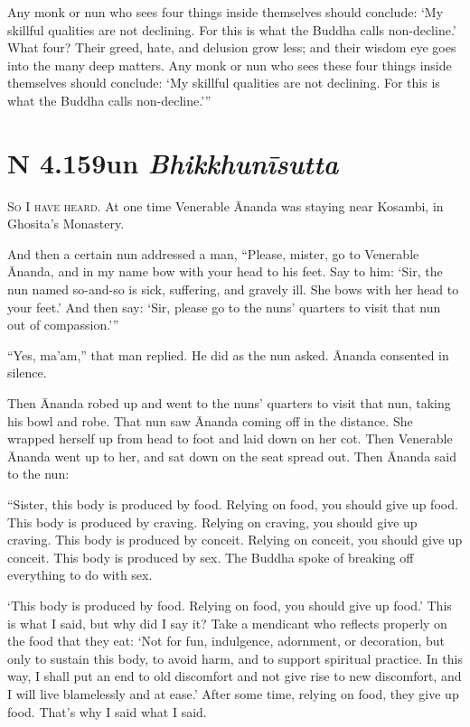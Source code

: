 \documentclass[12pt,openany]{book}%
\newcommand*{\suttatitleacronym}[1]{\smaller[2]{#1}\vspace*{.3em}}
\newcommand*{\suttatitletranslation}[1]{\linebreak{#1}}
\newcommand*{\suttatitleroot}[1]{\linebreak\smaller[2]\itshape{#1}}
\newcommand*{\tocacronym}[1]{\hspace*{-3.3em}{#1}\quad}
\newcommand*{\toctranslation}[1]{#1}
\newcommand*{\tocroot}[1]{(\textit{#1})}
\newcommand*{\scevam}[1]{\textsc{#1}}
\begin{document}
Any monk or nun who sees four things inside themselves should conclude: ‘My skillful qualities are not declining. For this is what the Buddha calls non-decline.’ What four? Their greed, hate, and delusion grow less; and their wisdom eye goes into the many deep matters. Any monk or nun who sees these four things inside themselves should conclude: ‘My skillful qualities are not declining. For this is what the Buddha calls non-decline.’” 

%
\section*{{\suttatitleacronym AN 4.159}{\suttatitletranslation Nun }{\suttatitleroot Bhikkhunīsutta}}
\addcontentsline{toc}{section}{\tocacronym{AN 4.159} \toctranslation{Nun } \tocroot{Bhikkhunīsutta}}

\scevam{So I have heard. }At one time Venerable Ānanda was staying near Kosambi, in Ghosita’s Monastery. 

And then a certain nun addressed a man, “Please, mister, go to Venerable Ānanda, and in my name bow with your head to his feet. Say to him: ‘Sir, the nun named so-and-so is sick, suffering, and gravely ill. She bows with her head to your feet.’ And then say: ‘Sir, please go to the nuns’ quarters to visit that nun out of compassion.’” 

“Yes, ma’am,” that man replied. He did as the nun asked. Ānanda consented in silence. 

Then Ānanda robed up and went to the nuns’ quarters to visit that nun, taking his bowl and robe. That nun saw Ānanda coming off in the distance. She wrapped herself up from head to foot and laid down on her cot. Then Venerable Ānanda went up to her, and sat down on the seat spread out. Then Ānanda said to the nun: 

“Sister, this body is produced by food. Relying on food, you should give up food. This body is produced by craving. Relying on craving, you should give up craving. This body is produced by conceit. Relying on conceit, you should give up conceit. This body is produced by sex. The Buddha spoke of breaking off everything to do with sex. 

‘This body is produced by food. Relying on food, you should give up food.’ This is what I said, but why did I say it? Take a mendicant who reflects properly on the food that they eat: ‘Not for fun, indulgence, adornment, or decoration, but only to sustain this body, to avoid harm, and to support spiritual practice. In this way, I shall put an end to old discomfort and not give rise to new discomfort, and I will live blamelessly and at ease.’ After some time, relying on food, they give up food. That’s why I said what I said. 
\end{document}
